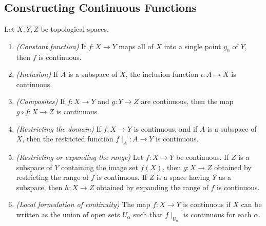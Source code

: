 \documentclass[10pt]{report}
\begin{document}
\subsection{Constructing Continuous Functions}
\begin{theorem}
  Let $X,Y,Z$ be topological spaces.
  \begin{enumerate}[label={(\alph*)}]
    \item \emph{(Constant function)} If $f:X \rightarrow Y$ maps all of $X$ into a single point $y_0$ of $Y$, then $f$ is continuous.
    \item \emph{(Inclusion)} If $A$ is a subspace of $X$, the inclusion function $\iota: A \rightarrow X$ is continuous.
    \item \emph{(Composites)} If $f: X \rightarrow Y$ and $g:Y \rightarrow Z$ are continuous, then the map $g \circ f: X \rightarrow Z$ is continuous.
    \item \emph{(Restricting the domain)} If $f:X \rightarrow Y$ is continuous, and if $A$ is a subspace of $X$, then the restricted function $f \mid _A : A \rightarrow Y$ is continuous.
    \item \emph{(Restricting or expanding the range)} Let $f:X \rightarrow Y$ be continuous.
      If $Z$ is a subspace of $Y$ containing the image set $f(X)$, then $g:X \rightarrow Z$ obtained by restricting the range of $f$ is continuous.
      If $Z$ is a space having $Y$ as a subspace, then $h:X \rightarrow Z$ obtained by expanding the range of $f$ is continuous.
   \item \emph{(Local formulation of continuity)} The map $f:X \rightarrow Y$ is continuous if $X$ can be written as the union of open sets $U_\alpha$ such that $f \mid _{U_\alpha}$ is continuous for each $\alpha$.
  \end{enumerate}
\end{theorem}
\end{document}
